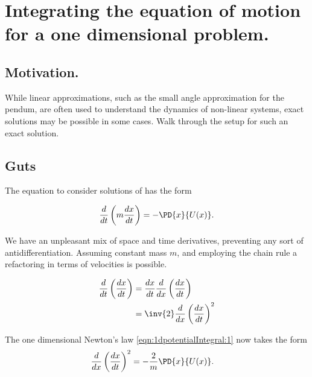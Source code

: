 

\chapter{Integrating the equation of motion for a one dimensional problem.}
\label{chap:1dpotentialIntegral}
{}
\date{Jan 1, 2010}

\beginArtNoToc

\section{Motivation.}

While linear approximations, such as the small angle approximation for the pendum, are often used to understand the dynamics of non-linear systems, exact solutions may be possible in some cases.  Walk through the setup for such an exact solution.

\section{Guts}

The equation to consider solutions of has the form

\begin{align}
\label{eqn:1dpotentialIntegral:1}
\frac{d}{dt} \left( m \frac{dx}{dt} \right) = -\PD{x}{U(x)}.
\end{align}

We have an unpleasant mix of space and time derivatives, preventing any sort of antidifferentiation.  Assuming constant mass $m$, and employing the chain rule a refactoring in terms of velocities is possible.

\begin{align*}
\frac{d}{dt} \left( \frac{dx}{dt} \right) 
&= 
\frac{dx}{dt} \frac{d}{dx} \left( \frac{dx}{dt} \right)  \\
&= 
\inv{2} \frac{d}{dx} \left( \frac{dx}{dt} \right)^2  \\
\end{align*}

The one dimensional Newton's law \autoref{eqn:1dpotentialIntegral:1} now takes the form
\begin{align}
\label{eqn:1dpotentialIntegral:2}
\frac{d}{dx} \left( \frac{dx}{dt} \right)^2 &= -\frac{2}{m} \PD{x}{U(x)}.
\end{align}

